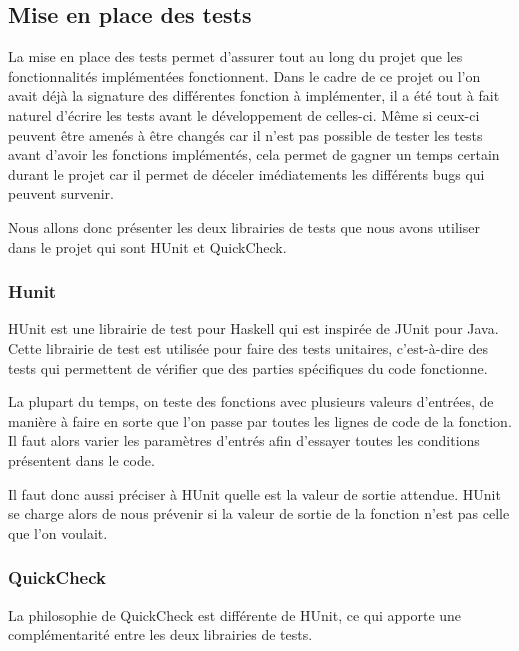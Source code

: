 \subsection{Mise en place des tests}

La mise en place des tests permet d'assurer tout au long du projet que les fonctionnalités implémentées fonctionnent. Dans le cadre de ce projet ou l'on avait déjà la signature des différentes fonction à implémenter, il a été tout à fait naturel d'écrire les tests avant le développement de celles-ci. Même si ceux-ci peuvent être amenés à être changés car il n'est pas possible de tester les tests avant d'avoir les fonctions implémentés, cela permet de gagner un temps certain durant le projet car il permet de déceler imédiatements les différents bugs qui peuvent survenir.

\medskip

Nous allons donc présenter les deux librairies de tests que nous avons utiliser dans le projet qui sont HUnit et QuickCheck.

    \subsubsection{Hunit}

        HUnit est une librairie de test pour Haskell qui est inspirée de JUnit pour Java. Cette librairie de test est utilisée pour faire des tests unitaires, c'est-à-dire des tests qui permettent de vérifier que des parties spécifiques du code fonctionne.

        \smallskip

        La plupart du temps, on teste des fonctions avec plusieurs valeurs d'entrées, de manière à faire en sorte que l'on passe par toutes les lignes de code de la fonction. Il faut alors varier les paramètres d'entrés afin d'essayer toutes les conditions présentent dans le code.

        \smallskip

        Il faut donc aussi préciser à HUnit quelle est la valeur de sortie attendue. HUnit se charge alors de nous prévenir si la valeur de sortie de la fonction n'est pas celle que l'on voulait.

    \subsubsection{QuickCheck}

        La philosophie de QuickCheck est différente de HUnit, ce qui apporte une complémentarité entre les deux librairies de tests.

